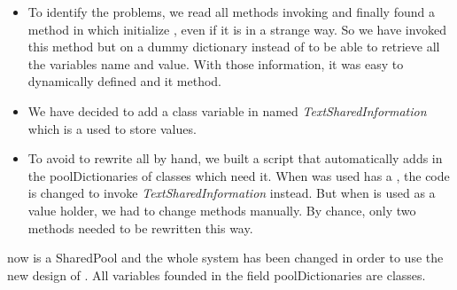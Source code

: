 \solutions
\begin{itemize}
	\item To identify the problems, we read all methods invoking  and finally found a method in  which initialize , even if it is in a strange way. So we have invoked this method but on a dummy dictionary instead of  to be able to retrieve all the variables name and value. With those information, it was easy to dynamically defined  and it  method.
	\item We have decided to add a class variable in  named \emph{TextSharedInformation} which is a  used to store values.
	\item To avoid to rewrite all by hand, we built a script that automatically adds  in the poolDictionaries of classes which need it. When  was used has a , the code is changed to invoke \emph{TextSharedInformation} instead. But when  is used as a value holder, we had to change methods manually. By chance, only two methods needed to be rewritten this way.
\end{itemize}
	
\inanutshell now  is a SharedPool and the whole system has been changed in order to use the new design of . All variables founded in the field poolDictionaries are classes.
	
